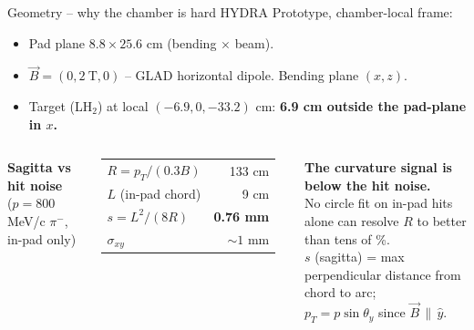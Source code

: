 \documentclass[aspectratio=169]{beamer}
\begin{document}
\begin{frame}{Geometry -- why the chamber is hard}
HYDRA Prototype, chamber-local frame:
\begin{itemize}
  \item Pad plane $8.8 \times 25.6$ cm (bending $\times$ beam).
  \item $\vec{B} = (0, 2~\text{T}, 0)$ -- GLAD horizontal dipole. Bending plane $(x, z)$.
  \item Target (LH$_2$) at local $(-6.9, 0, -33.2)$ cm:
        \textbf{6.9 cm outside the pad-plane in $x$.}
\end{itemize}
\vfill
\begin{columns}[c,onlytextwidth]
\centering
\textbf{Sagitta vs hit noise}\\($p = 800$ MeV/c $\pi^-$, in-pad only)\\[0.4em]
\large
\begin{tabular}{lr}
\toprule
$R = p_T / (0.3 B)$  & 133 cm \\
$L$ (in-pad chord)   & 9 cm \\
$s = L^2/(8R)$       & \textbf{0.76 mm} \\
$\sigma_{xy}$        & $\sim 1$ mm \\
\bottomrule
\end{tabular}
\textcolor{warn}{\textbf{The curvature signal is below the hit noise.}}\\[0.6em]
No circle fit on in-pad hits alone can resolve $R$ to better than tens of \%.\\[0.8em]
\scriptsize
$s$ (sagitta) = max perpendicular distance from chord to arc;\\
$p_T = p\sin\theta_y$ since $\vec{B}\,\|\,\hat{y}$.
\end{columns}
\end{frame}
\end{document}
